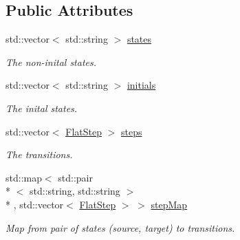 \subsection*{Public Attributes}
\begin{DoxyCompactItemize}
\item 
\hypertarget{structfsml_1_1FlatMachine_a5f3c317f5a3a8f13f10160dcaeef63e3}{std\-::vector$<$ std\-::string $>$ \hyperlink{structfsml_1_1FlatMachine_a5f3c317f5a3a8f13f10160dcaeef63e3}{states}}\label{structfsml_1_1FlatMachine_a5f3c317f5a3a8f13f10160dcaeef63e3}

\begin{DoxyCompactList}\small\item\em The non-\/inital states. \end{DoxyCompactList}\item 
\hypertarget{structfsml_1_1FlatMachine_a3069121ea01eab1cec46590ab186b622}{std\-::vector$<$ std\-::string $>$ \hyperlink{structfsml_1_1FlatMachine_a3069121ea01eab1cec46590ab186b622}{initials}}\label{structfsml_1_1FlatMachine_a3069121ea01eab1cec46590ab186b622}

\begin{DoxyCompactList}\small\item\em The inital states. \end{DoxyCompactList}\item 
\hypertarget{structfsml_1_1FlatMachine_a2fc01c07d6bc3f62fba880e96e538390}{std\-::vector$<$ \hyperlink{structfsml_1_1FlatStep}{Flat\-Step} $>$ \hyperlink{structfsml_1_1FlatMachine_a2fc01c07d6bc3f62fba880e96e538390}{steps}}\label{structfsml_1_1FlatMachine_a2fc01c07d6bc3f62fba880e96e538390}

\begin{DoxyCompactList}\small\item\em The transitions. \end{DoxyCompactList}\item 
\hypertarget{structfsml_1_1FlatMachine_ae8ebf27b84297afc058dd9329883f17a}{std\-::map$<$ std\-::pair\\*
$<$ std\-::string, std\-::string $>$\\*
, std\-::vector$<$ \hyperlink{structfsml_1_1FlatStep}{Flat\-Step} $>$ $>$ \hyperlink{structfsml_1_1FlatMachine_ae8ebf27b84297afc058dd9329883f17a}{step\-Map}}\label{structfsml_1_1FlatMachine_ae8ebf27b84297afc058dd9329883f17a}

\begin{DoxyCompactList}\small\item\em Map from pair of states (source, target) to transitions. \end{DoxyCompactList}\end{DoxyCompactItemize}


